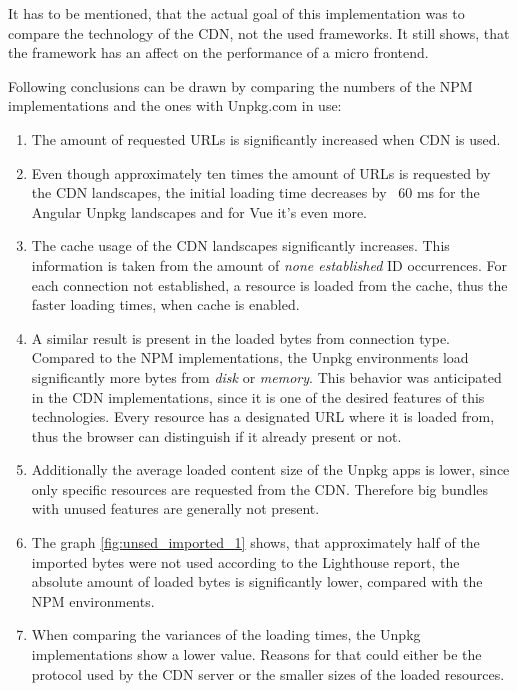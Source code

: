 It has to be mentioned, that the actual goal of this implementation was to compare the technology of the CDN, not the used frameworks. It still shows, that the framework has an affect on the performance of a micro frontend. 

Following conclusions can be drawn by comparing the numbers of the NPM implementations and the ones with Unpkg.com in use:

\begin{enumerate}
	\item The amount of requested URLs is significantly increased when CDN is used.
	\item Even though approximately ten times the amount of URLs is requested by the CDN landscapes, the initial loading time decreases by ~60 ms for the Angular Unpkg landscapes and for Vue it's even more.
	\item The cache usage of the CDN landscapes significantly increases. This information is taken from the amount of \textit{none established} ID occurrences. For each connection not established, a resource is loaded from the cache, thus the faster loading times, when cache is enabled.
	\item A similar result is present in the loaded bytes from connection type. Compared to the NPM implementations, the Unpkg environments load significantly more bytes from \textit{disk} or \textit{memory}. This behavior was anticipated in the CDN implementations, since it is one of the desired features of this technologies. Every resource has a designated URL where it is loaded from, thus the browser can distinguish if it already present or not.
	\item Additionally the average loaded content size of the Unpkg apps is lower, since only specific resources are requested from the CDN. Therefore big bundles with unused features are generally not present.
	\item The graph \ref{fig:unsed_imported_1} shows, that approximately half of the imported bytes were not used according to the Lighthouse report, the absolute amount of loaded bytes is significantly lower, compared with the NPM environments.
	\item When comparing the variances of the loading times, the Unpkg implementations show a lower value. Reasons for that could either be the protocol used by the CDN server or the smaller sizes of the loaded resources.
\end{enumerate}

